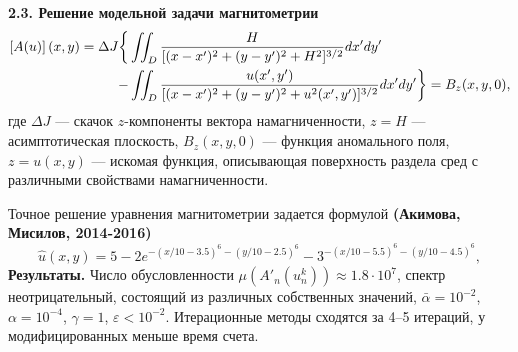 \documentclass[10pt,pdf, mathserif, hyperref={unicode}]{beamer}
\begin{document}
\begin{frame}{\small\textbf{2.3. Решение модельной задачи магнитометрии}}
	\begin{equation*}\begin{aligned}
	\left[A(u)\right](x,y)=\Delta J  \bigg\{&\iint_{D} \frac{H}{[(x-x')^2+(y-y')^2+H^2]^{3/2}}dx'dy' \notag\\
	- &\iint_{D} \frac{u(x',y')}{[(x-x')^2+(y-y')^2+u^2(x',y')]^{3/2}}dx'dy' \bigg\}= B_z(x,y,0),
	\end{aligned} \end{equation*}
	где $\Delta J$ --- скачок $z$-компоненты вектора намагниченности, $z=H$ --- асимптотическая плоскость, $ B_z(x,y,0)$ --- функция аномального поля, $z=u(x,y)$ --- искомая функция, описывающая поверхность раздела сред с различными свойствами намагниченности.
	
	\smallskip
	Точное решение уравнения магнитометрии задается формулой \textbf{\color{red}(Акимова, Мисилов, 2014-2016)}
	$$\hat{u}(x,y)=5-2e^{-(x/10-3.5)^6-(y/10-2.5)^6}-3^{-(x/10-5.5)^6-(y/10-4.5)^6},$$
	\textbf{\color{blue}Результаты.} Число обусловленности $\mu(A'_n(u_n^k))\approx 1.8\cdot 10^7$, спектр неотрицательный, состоящий из различных собственных значений, $\bar\alpha=10^{-2}$, $\alpha = 10^{-4}$, $\gamma=1$, $\varepsilon < 10^{-2}$. Итерационные методы сходятся за 4--5 итераций, у модифицированных меньше время счета.
\end{frame}
%	
%		
\end{document}
